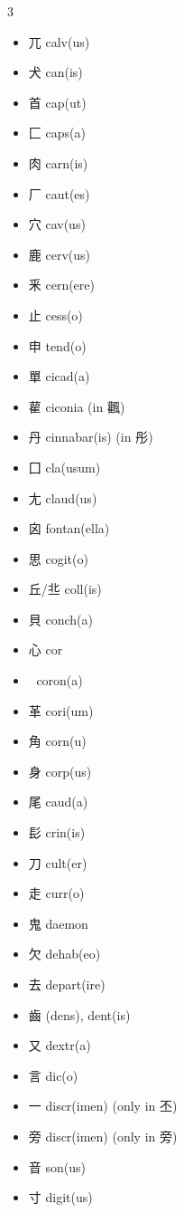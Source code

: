 \documentclass[xetex, svgnames, 12pt]{scrartcl}
\begin{document}
\begin{multicols}{3}
\begin{itemize}[noitemsep]
    \item 兀 calv(us)
    \item 犬 can(is) 
    \item 首 cap(ut) 
    \item 匚 caps(a)
    \item 肉 carn(is) 
    \item 厂 caut(es)
    \item 穴 cav(us) 
    \item 鹿 cerv(us) 
    \item 釆 cern(ere)
    \item 止 cess(o)
    \item 申 tend(o)
    \item 單 cicad(a)
    \item 雚 ciconia (in 飌)
    \item 丹 cinnabar(is) (in 彤)
    \item 囗 cla(usum) 
    \item 尢 claud(us)
    \item 囟 fontan(ella)
    \item 思 
    cogit(o) 
    \item 丘/丠 coll(is)
    \item 貝 conch(a)
    \item 心 cor 
    \item 𤼽 coron(a)
    \item 革 
    cori(um) 
    \item 角 corn(u) 
    \item 身 corp(us)
    \item 尾 caud(a)
    \item 髟 crin(is) 
    \item 刀 cult(er)
    \item 走 curr(o)     
    \item 鬼 daemon 
    \item 欠 dehab(eo)
    \item 去 depart(ire)
    \item 齒 (dens), dent(is)
    \item 又 dextr(a)
    \item 言 dic(o) 
    \item 一 discr(imen) (only in 丕)
    \item 旁 discr(imen) (only in 旁)
    \item 音 son(us)
    \item 寸 digit(us)

\end{itemize}
\end{multicols}
\end{document}
